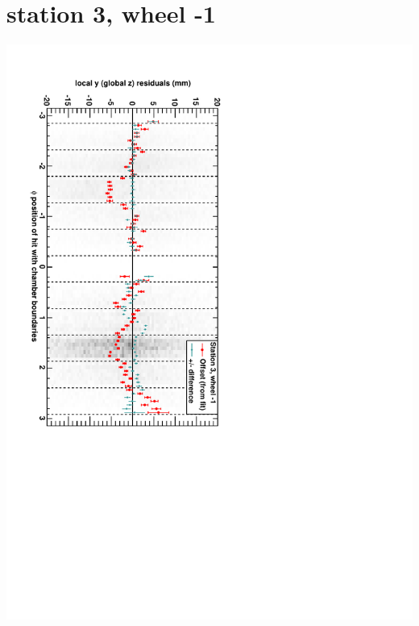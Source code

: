 \documentclass[compress]{beamer}
\begin{document}
\section*{station 3, wheel -1}
\begin{frame} \vfill \mbox{\hspace{-1 cm}\includegraphics[height=1.2\linewidth, angle=90]{DTzVsPhi_st3_whB.pdf}} \end{frame}
\end{document}
